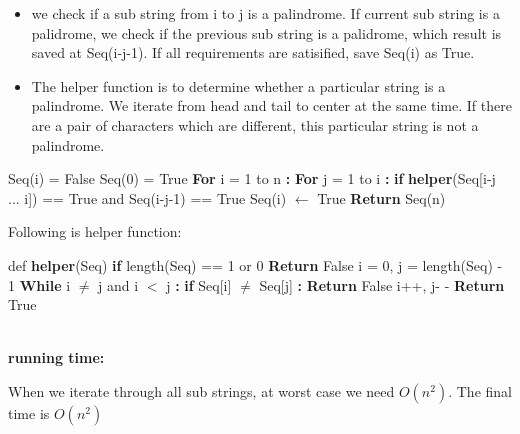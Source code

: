 \documentclass[12pt]{article}
\begin{document}
\begin{itemize}
  \item we check if a sub string from i to j is a palindrome. 
	If current sub string is a palidrome, we check if the previous sub string is a palidrome, which result is saved at Seq(i-j-1).
	If all requirements are satisified, save Seq(i) as True.
  \item The helper function is to determine whether a particular string is a palindrome. 
	We iterate from head and tail to center at the same time. 
	If there are a pair of characters which are different, this particular string is not a palindrome.
\end{itemize}

\begin{algorithm}
\begin{algorithmic}
\State Seq(i) = False
\State Seq(0) = True
\State \textbf{For} i = 1 to n \textbf{:}
\State \hspace{0.4cm} \textbf{For} j = 1 to i \textbf{:}
\State \hspace{0.8cm} \textbf{if} \textbf{helper}(Seq[i-j ... i]) == True and Seq(i-j-1) == True
\State \hspace{1.2cm} Seq(i) $\leftarrow$ True
\State \textbf{Return} Seq(n)
\end{algorithmic}
\end{algorithm}
Following is helper function: 
\begin{algorithm}
\begin{algorithmic}
\State def \textbf{helper}(Seq)
\State \hspace{0.4cm} \textbf{if} length(Seq) == 1 or 0
\State \hspace{0.8cm} \textbf{Return} False
\State \hspace{0.4cm} i = 0, j = length(Seq) - 1
\State \hspace{0.4cm} \textbf{While} i $\not=$ j and i $<$ j \textbf{:} 
\State \hspace{0.8cm} \textbf{if} Seq[i] $\not=$ Seq[j] \textbf{:}
\State \hspace{1.2cm} \textbf{Return} False
\State \hspace{0.8cm} i++, j- -
\State \textbf{Return} True
\end{algorithmic}
\end{algorithm}
\noindent \\
\textbf{running time:} \par 
When we iterate through all sub strings, at worst case we need $O(n^2)$.
The final time is $O(n^2)$
\end{document}
